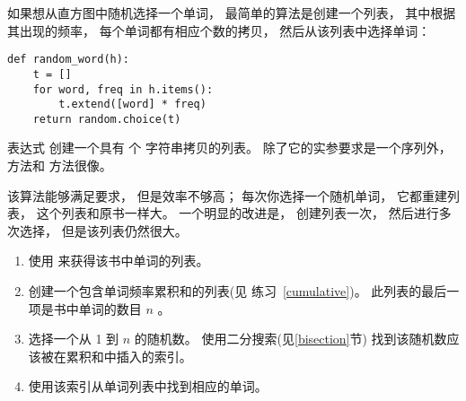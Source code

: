 如果想从直方图中随机选择一个单词， 最简单的算法是创建一个列表，
其中根据其出现的频率， 每个单词都有相应个数的拷贝， 然后从该列表中选择单词：

\begin{lstlisting}
def random_word(h):
    t = []
    for word, freq in h.items():
        t.extend([word] * freq)
    return random.choice(t)
\end{lstlisting}


表达式  创建一个具有  个  字符串拷贝的列表。
除了它的实参要求是一个序列外，  方法和  方法很像。


该算法能够满足要求， 但是效率不够高；
每次你选择一个随机单词， 它都重建列表， 这个列表和原书一样大。
一个明显的改进是， 创建列表一次， 然后进行多次选择，  但是该列表仍然很大。

\begin{enumerate}

\item 使用  来获得该书中单词的列表。


\item 创建一个包含单词频率累积和的列表(见 练习~\ref{cumulative})。    此列表的最后一项是书中单词的数目 $n$ 。


\item 选择一个从 1 到 $n$ 的随机数。   使用二分搜索(见\ref{bisection}节)  找到该随机数应该被在累积和中插入的索引。


\item 使用该索引从单词列表中找到相应的单词。
\end{enumerate}

